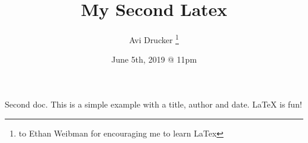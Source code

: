 \documentclass{article}
\title{My Second Latex}
\author{Avi Drucker \thanks{to Ethan Weibman for encouraging me to learn LaTex}}
\date{June 5th, 2019 @ 11pm}
\begin{document}
\maketitle

Second doc. This is a simple example with a title, author and date. \LaTeX{} is fun!
\end{document}
